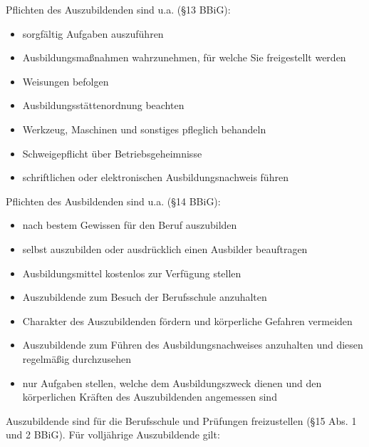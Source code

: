 Pflichten des Auszubildenden sind u.a. (§13 BBiG):

\begin{itemize}
    \item sorgfältig Aufgaben auszuführen
    \item Ausbildungsmaßnahmen wahrzunehmen, für welche Sie freigestellt werden
    \item Weisungen befolgen
    \item Ausbildungsstättenordnung beachten
    \item Werkzeug, Maschinen und sonstiges pfleglich behandeln
    \item Schweigepflicht über Betriebsgeheimnisse
    \item schriftlichen oder elektronischen Ausbildungsnachweis führen
\end{itemize}

Pflichten des Ausbildenden sind u.a. (§14 BBiG):

\begin{itemize}
    \item nach bestem Gewissen für den Beruf auszubilden
    \item selbst auszubilden oder ausdrücklich einen Ausbilder beauftragen
    \item Ausbildungsmittel kostenlos zur Verfügung stellen
    \item Auszubildende zum Besuch der Berufsschule anzuhalten
    \item Charakter des Auszubildenden fördern und körperliche Gefahren vermeiden
    \item Auszubildende zum Führen des Ausbildungsnachweises anzuhalten und diesen regelmäßig durchzusehen
    \item nur Aufgaben stellen, welche dem Ausbildungszweck dienen und den körperlichen Kräften des Auszubildenden angemessen sind
\end{itemize}

Auszubildende sind für die Berufsschule und Prüfungen freizustellen (§15 Abs. 1 und 2 BBiG). Für volljährige Auszubildende gilt:

